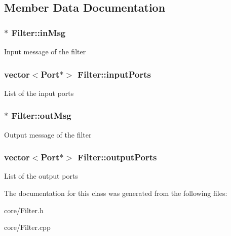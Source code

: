 \subsection{Member Data Documentation}
\hypertarget{classFilter_ac938e02933af2dfb267895d260221d92}{
\subsubsection[{in\-Msg}]{$\ast$ Filter\-::in\-Msg\hspace{0.3cm}{\ttfamily [protected]}}}\label{classFilter_ac938e02933af2dfb267895d260221d92}
Input message of the filter \hypertarget{classFilter_ad09f0773f4b96d6f9ac143bb5b046d0b}{
\subsubsection[{input\-Ports}]{\setlength{\rightskip}{0pt plus 5cm}vector$<${\bf Port}$\ast$$>$ Filter\-::input\-Ports\hspace{0.3cm}{\ttfamily [protected]}}}\label{classFilter_ad09f0773f4b96d6f9ac143bb5b046d0b}
List of the input ports \hypertarget{classFilter_a5c1d2a7a7da437769281029505ef3054}{
\subsubsection[{out\-Msg}]{$\ast$ Filter\-::out\-Msg\hspace{0.3cm}{\ttfamily [protected]}}}\label{classFilter_a5c1d2a7a7da437769281029505ef3054}
Output message of the filter \hypertarget{classFilter_abf9b24a29561046ca09c65f5dde427ea}{
\subsubsection[{output\-Ports}]{\setlength{\rightskip}{0pt plus 5cm}vector$<${\bf Port}$\ast$$>$ Filter\-::output\-Ports\hspace{0.3cm}{\ttfamily [protected]}}}\label{classFilter_abf9b24a29561046ca09c65f5dde427ea}
List of the output ports 

The documentation for this class was generated from the following files\-:\begin{DoxyCompactItemize}
\item 
core/Filter.\-h\item 
core/Filter.\-cpp\end{DoxyCompactItemize}
